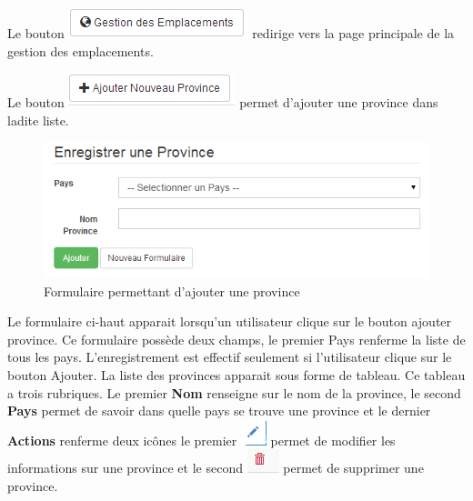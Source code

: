 \documentclass[12pt,a4paper]{report}
\begin{document}
Le bouton \includegraphics[scale=0.7]{pic/GestionEmplacement.png} redirige vers la page principale de la gestion des emplacements.

Le bouton \includegraphics[scale=0.7]{pic/AddNewProvince.png} permet d'ajouter une province dans ladite liste.
\newpage
\begin{figure}[h]
\begin{center}
\includegraphics[width=14cm]{pic/FormNewProvince.png}
\end{center}
\caption{Formulaire permettant d'ajouter une province}
\label{Formulaire permettant d'ajouter une province}
\end{figure}


Le formulaire ci-haut apparait lorsqu'un utilisateur clique sur le bouton ajouter province. Ce formulaire possède deux champs, le premier Pays renferme la liste de tous les pays. 
L'enregistrement est effectif seulement si l'utilisateur clique sur le bouton Ajouter. La liste des provinces apparait sous forme de tableau. Ce tableau a trois rubriques. Le premier \textbf{Nom} renseigne sur le nom de la province, le second \textbf{Pays} permet de savoir dans quelle pays se trouve une province et le dernier \textbf{Actions} renferme deux icônes le premier 
\includegraphics[scale=0.7]{pic/EditUser.png}  permet de modifier les informations sur une province et le second  \includegraphics[scale=0.7]{pic/DeleteWRed.png}  permet de supprimer une province.
\end{document}

